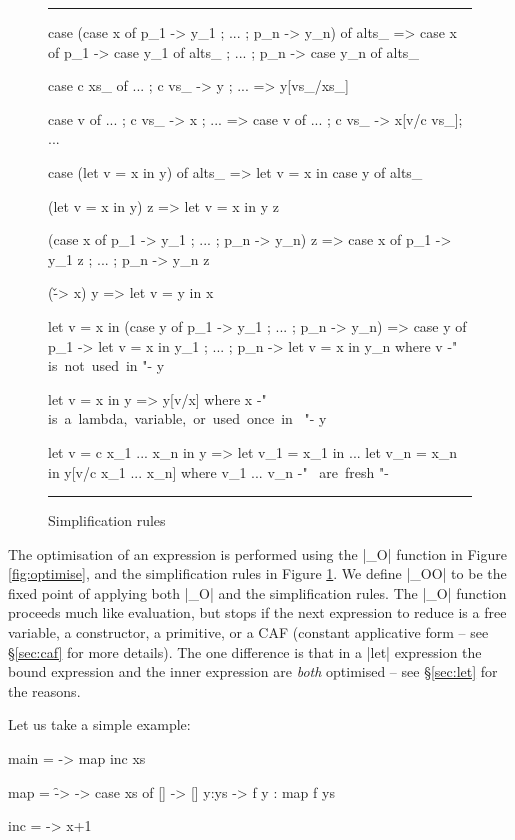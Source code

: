 \documentclass{llncs}
\newenvironment{fig}
    {\begin{figure}[tbp]\hrule}
    {\end{figure}}
\newcommand{\figend}{\hrule}
\begin{document}
\begin{fig}
\begin{code}
case (case x of {p_1 -> y_1 ; ... ; p_n -> y_n}) of alts_
    => case x of  {  p_1  -> case y_1 of alts_
                  ;  ...
                  ;  p_n  -> case y_n of alts_ }

case c xs_ of {... ; c vs_ -> y ; ...}
    => y[vs_/xs_]

case v of {... ; c vs_ -> x ; ...}
    => case v of {... ; c vs_ -> x[v/c vs_]; ...}

case (let v = x in y) of alts_
    => let v = x in case y of alts_

(let v = x in y) z
    => let v = x in y z

(case x of {p_1 -> y_1 ; ... ; p_n -> y_n}) z
    => case x of {p_1 -> y_1 z ; ... ; p_n -> y_n z}

(\v -> x) y
    => let v = y in x

let v = x in (case y of {p_1 -> y_1 ; ... ; p_n -> y_n})
    => case y of  {  p_1  -> let v = x in y_1
                  ;  ...
                  ;  p_n  -> let v = x in y_n}
    where v {-" \hbox{is not used in} "-} y

let v = x in y
    => y[v/x]
    where x {-" \hbox{is a lambda, variable, or used once in } "-} y

let v = c x_1 ... x_n in y
    =>  let v_1 = x_1 in
        ...
        let v_n = x_n in
        y[v/c x_1 ... x_n]
    where v_1 ... v_n {-" \hbox{ are fresh} "-}
\end{code}
\figend
\caption{Simplification rules}
\label{fig:simplify}
\end{fig}

The optimisation of an expression is performed using the |_O| function in Figure \ref{fig:optimise}, and the simplification rules in Figure \ref{fig:simplify}. We define |_OO| to be the fixed point of applying both |_O| and the simplification rules. The |_O| function proceeds much like evaluation, but stops if the next expression to reduce is a free variable, a constructor, a primitive, or a CAF (constant applicative form -- see \S\ref{sec:caf} for more details). The one difference is that in a |let| expression the bound expression and the inner expression are \textit{both} optimised -- see \S\ref{sec:let} for the reasons.

Let us take a simple example:

\begin{code}
main = \xs -> map inc xs

map = \f -> \xs -> case  xs of
                         []    -> []
                         y:ys  -> f y : map f ys

inc = \x -> x+1
\end{code}
\end{document}
